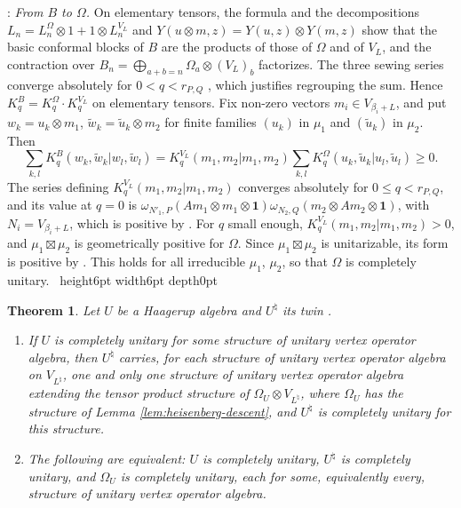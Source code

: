 \documentclass[leqno]{article}
\renewcommand{\leq}{\ensuremath{\leqslant}}
\renewcommand{\geq}{\ensuremath{\geqslant}}
\newcommand{\qed}{\hfill \vrule height6pt  width6pt depth0pt}
\newcommand{\ot}{\otimes}
\newtheorem{thm}{Theorem}[section]
\newenvironment{proof}[1][]{\noindent {\it Proof #1} : }{\hbox{~}\qed
\smallskip
}
\numberwithin{equation}{section}
\begin{document}
\begin{proof}
\emph{From $B$ to $\Omega$.} On elementary tensors, the formula \cite[(6.11) p.~40]{Gui24} and the decompositions $L_n = L^\Omega_n \ot 1 + 1 \ot L^{V_L}_n$ and $Y(u \ot m,z) = Y(u,z) \ot Y(m,z)$ show that the basic conformal blocks of $B$ are the products of those of $\Omega$ and of $V_L$, and the contraction over $B_n = \bigoplus_{a+b=n}\Omega_a \ot (V_L)_b$ factorizes. The three sewing series converge absolutely for $0 < q < r_{P,Q}$ \cite[Section 7.1 p.~43]{Gui24}, which justifies regrouping the sum. Hence $K^B_q = K^\Omega_q \cdot K^{V_L}_q$ on elementary tensors. Fix non-zero vectors $m_i \in V_{\beta_i+L}$, and put $w_k = u_k \ot m_1$, $\tilde w_k = \tilde u_k \ot m_2$ for finite families $(u_k)$ in $\mu_1$ and $(\tilde u_k)$ in $\mu_2$. Then
\[
\sum_{k,l} K^B_q(w_k,\tilde w_k  |  w_l,\tilde w_l) = K^{V_L}_q(m_1,m_2  |  m_1,m_2)\sum_{k,l}K^\Omega_q(u_k,\tilde u_k  |  u_l,\tilde u_l) \geq 0.
\]
The series defining $K^{V_L}_q(m_1,m_2  |  m_1,m_2)$ converges absolutely for $0 \leq q < r_{P,Q}$, and its value at $q = 0$ is $\omega_{N'_1,P}(Am_1 \ot m_1 \ot \mathbf 1) \omega_{N_2,Q}(m_2 \ot Am_2 \ot \mathbf 1)$, with $N_i = V_{\beta_i+L}$, which is positive by \cite[Proposition 6.13 p.~42]{Gui24}. For $q$ small enough, $K^{V_L}_q(m_1,m_2  |  m_1,m_2) > 0$, and $\mu_1 \boxtimes \mu_2$ is geometrically positive for $\Omega$. Since $\mu_1 \boxtimes \mu_2$ is unitarizable, its form is positive by \cite[Corollary 8.4 p.~53]{Gui24}. This holds for all irreducible $\mu_1$, $\mu_2$, so that $\Omega$ is completely unitary.
\end{proof}

\begin{thm}
\label{thm:twin-cu}
Let $U$ be a Haagerup algebra and $U^\natural$ its twin \cite[Theorem 12.3]{Arh26}.
\begin{enumerate}
\item If $U$ is completely unitary for some structure of unitary vertex operator algebra, then $U^\natural$ carries, for each structure of unitary vertex operator algebra on $V_{L^\natural}$, one and only one structure of unitary vertex operator algebra extending the tensor product structure of $\Omega_U \ot V_{L^\natural}$, where $\Omega_U$ has the structure of Lemma \ref{lem:heisenberg-descent}, and $U^\natural$ is completely unitary for this structure.
\item The following are equivalent: $U$ is completely unitary, $U^\natural$ is completely unitary, and $\Omega_U$ is completely unitary, each for some, equivalently every, structure of unitary vertex operator algebra.
\end{enumerate}
\end{thm}
\end{document}
